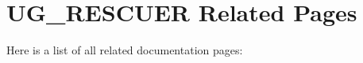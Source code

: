 \section{UG\_\-RESCUER Related Pages}
Here is a list of all related documentation pages:\begin{CompactList}
\item {}

\end{CompactList}

